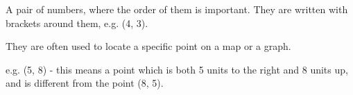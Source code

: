 A pair of numbers, where the order of them is important.  
They are written with brackets around them, e.g. (4, 3). 

\par
They are  often used to locate a specific point on a map or a graph.

\par
e.g. (5, 8) - this means a point which is both 5 units to the right and 8 units 
up, and is different from the point (8, 5).